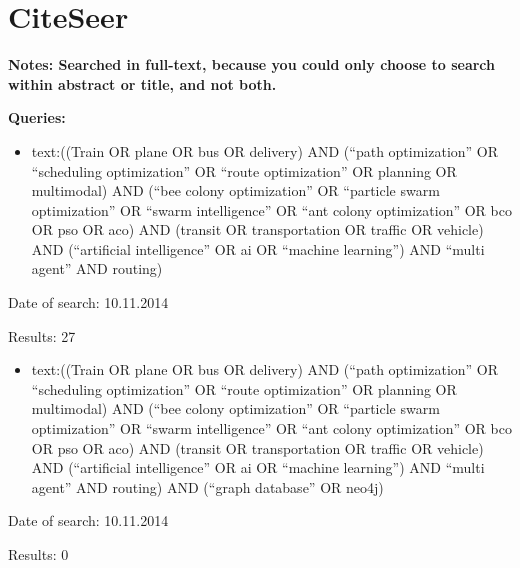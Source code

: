\section{CiteSeer}
\textbf{Notes: Searched in full-text, because you could only choose to search within abstract or title, and not both.}
\par
\textbf{Queries:}
\begin{itemize}
\item text:((Train OR plane OR bus OR delivery) AND (``path optimization'' OR ``scheduling optimization'' OR ``route optimization'' OR planning OR multimodal) AND (``bee colony optimization'' OR ``particle swarm optimization'' OR ``swarm intelligence'' OR ``ant colony optimization'' OR bco OR pso OR aco) AND (transit OR transportation OR traffic OR vehicle) AND (``artificial intelligence'' OR ai OR ``machine learning'') AND ``multi agent'' AND routing)
\end{itemize}
\par Date of search: 10.11.2014
\par Results: 27
\begin{itemize}
\item text:((Train OR plane OR bus OR delivery) AND (``path optimization'' OR ``scheduling optimization'' OR ``route optimization'' OR planning OR multimodal) AND (``bee colony optimization'' OR ``particle swarm optimization'' OR ``swarm intelligence'' OR ``ant colony optimization'' OR bco OR pso OR aco) AND (transit OR transportation OR traffic OR vehicle) AND (``artificial intelligence'' OR ai OR ``machine learning'') AND ``multi agent'' AND routing) AND (``graph database'' OR neo4j)
\end{itemize}
\par Date of search: 10.11.2014
\par Results: 0
 

